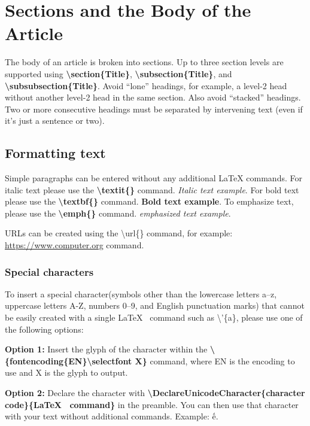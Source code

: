 \documentclass{csmagazine}
\begin{document}
\section{Sections and the Body of the Article}

The body of an article is broken into sections. Up to three section levels are supported using \textbf{\textbackslash{}section\{Title\}}, \textbf{\textbackslash{}subsection\{Title\}}, and \textbf{\textbackslash{}subsubsection\{Title\}}. Avoid ``lone'' headings, for example, a level-2 head without another level-2 head in the same section. Also avoid ``stacked'' headings. Two or more consecutive headings must be separated by intervening text (even if it's just a sentence or two).

\subsection{Formatting text}

Simple paragraphs can be entered without any additional LaTeX commands. For italic text please use the \textbf{\textbackslash{}textit\{\}} command. \textit{Italic text example}. For bold text please use the \textbf{\textbackslash{}textbf\{\}} command. \textbf{Bold text example}. To emphasize text, please use the \textbf{\textbackslash{}emph\{\}} command. \emph{emphasized text example}.

URLs can be created using the \textbackslash{}url\{\} command, for example: \url{https://www.computer.org} command.

\subsubsection{Special characters}

To insert a special character(symbols other than the lowercase letters a–z, uppercase letters A-Z, numbers 0–9, and English punctuation marks) that cannot be easily created with a single \LaTeX~ command such as \textbackslash{}'\{a\}, please use one of the following options:

\textbf{Option 1:} Insert the glyph of the character within the \textbf{\textbackslash{}\{fontencoding\{EN\}\textbackslash{}selectfont X\}} command, where EN is the encoding to use and X is the glyph to output.


\textbf{Option 2:} Declare the character with \textbf{\textbackslash{}DeclareUnicodeCharacter\{character code\}\{\LaTeX~ command\}} in the preamble. You can then use that character with your text without additional commands. Example: ế.
\end{document}
